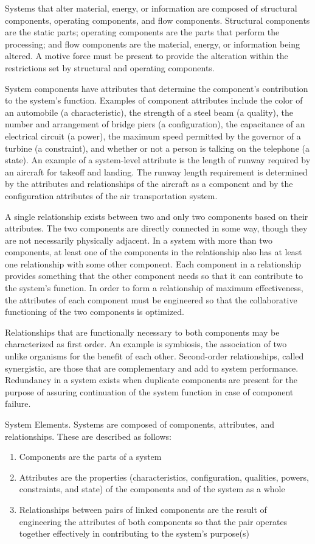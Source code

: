 Systems that alter material, energy, or information are composed of structural components, operating components, and flow components. Structural components are the static parts; operating components are the parts that perform the processing; and flow components are the material, energy, or information being altered. A motive force must be present to provide the alteration within the restrictions set by structural and operating components.

System components have attributes that determine the component’s contribution to the system’s function. Examples of component attributes include the color of an automobile (a characteristic), the strength of a steel beam (a quality), the number and arrangement of bridge piers (a configuration), the capacitance of an electrical circuit (a power), the maximum speed permitted by the governor of a turbine (a constraint), and whether or not a person is talking on the telephone (a state). An example of a system-level attribute is the length of runway required by an aircraft for takeoff and landing. The runway length requirement is determined by the attributes and relationships of the aircraft as a component and by the configuration attributes of the air transportation system.

A single relationship exists between two and only two components based on their attributes. The two components are directly connected in some way, though they are not necessarily physically adjacent. In a system with more than two components, at least one of the components in the relationship also has at least one relationship with some other component. Each component in a relationship provides something that the other component needs so that it can contribute to the system’s function. In order to form a relationship of maximum effectiveness, the attributes of each component must be engineered so that the collaborative functioning of the two components is optimized.

Relationships that are functionally necessary to both components may be characterized as first order. An example is symbiosis, the association of two unlike organisms for the benefit of each other. Second-order relationships, called synergistic, are those that are complementary and add to system performance. Redundancy in a system exists when duplicate components are present for the purpose of assuring continuation of the system function in case of component failure.

System Elements. Systems are composed of components, attributes, and relationships. These are described as follows:
\begin{enumerate}
\item Components are the parts of a system
\item Attributes are the properties (characteristics, configuration, qualities, powers, constraints, and state) of the components and of the system as a whole
\item Relationships between pairs of linked components are the result of engineering the attributes of both components so that the pair operates together effectively in contributing to the system’s purpose(s)
\end{enumerate}

